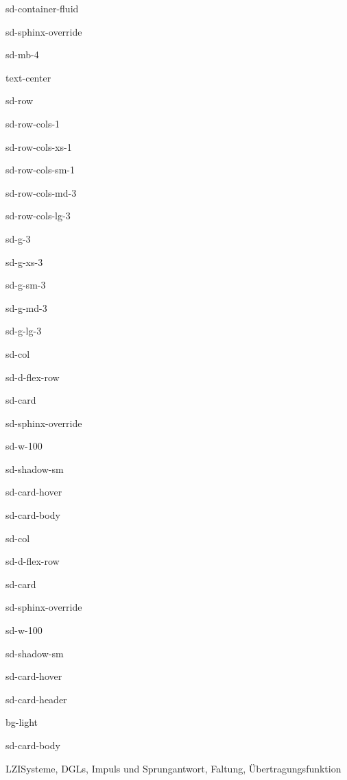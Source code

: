 \documentclass[letterpaper,10pt,english]{jupyterBook}
\let\sphinxpxdimen\pdfpxdimen\else\newdimen\sphinxpxdimen
\begin{document}
\begin{sphinxuseclass}{sd-container-fluid}
\begin{sphinxuseclass}{sd-sphinx-override}
\begin{sphinxuseclass}{sd-mb-4}
\begin{sphinxuseclass}{text-center}
\begin{sphinxuseclass}{sd-row}
\begin{sphinxuseclass}{sd-row-cols-1}
\begin{sphinxuseclass}{sd-row-cols-xs-1}
\begin{sphinxuseclass}{sd-row-cols-sm-1}
\begin{sphinxuseclass}{sd-row-cols-md-3}
\begin{sphinxuseclass}{sd-row-cols-lg-3}
\begin{sphinxuseclass}{sd-g-3}
\begin{sphinxuseclass}{sd-g-xs-3}
\begin{sphinxuseclass}{sd-g-sm-3}
\begin{sphinxuseclass}{sd-g-md-3}
\begin{sphinxuseclass}{sd-g-lg-3}
\begin{sphinxuseclass}{sd-col}
\begin{sphinxuseclass}{sd-d-flex-row}
\begin{sphinxuseclass}{sd-card}
\begin{sphinxuseclass}{sd-sphinx-override}
\begin{sphinxuseclass}{sd-w-100}
\begin{sphinxuseclass}{sd-shadow-sm}
\begin{sphinxuseclass}{sd-card-hover}
\begin{sphinxuseclass}{sd-card-body}
\end{sphinxuseclass}{\hyperref[\detokenize{content/3_FourierAnalyse::doc}]{}}
\end{sphinxuseclass}
\end{sphinxuseclass}
\end{sphinxuseclass}
\end{sphinxuseclass}
\end{sphinxuseclass}
\end{sphinxuseclass}
\end{sphinxuseclass}
\begin{sphinxuseclass}{sd-col}
\begin{sphinxuseclass}{sd-d-flex-row}
\begin{sphinxuseclass}{sd-card}
\begin{sphinxuseclass}{sd-sphinx-override}
\begin{sphinxuseclass}{sd-w-100}
\begin{sphinxuseclass}{sd-shadow-sm}
\begin{sphinxuseclass}{sd-card-hover}
\begin{sphinxuseclass}{sd-card-header}
\begin{sphinxuseclass}{bg-light}
\sphinxAtStartPar
{}

\end{sphinxuseclass}
\end{sphinxuseclass}
\begin{sphinxuseclass}{sd-card-body}
\noindent\sphinxincludegraphics[height=120\sphinxpxdimen]{{übertragungsfunktion}.png}

\sphinxAtStartPar
LZI\sphinxhyphen{}Systeme, DGLs, Impuls\sphinxhyphen{} und Sprungantwort, Faltung, Übertragungsfunktion


\end{sphinxuseclass}
\end{sphinxuseclass}
\end{sphinxuseclass}
\end{sphinxuseclass}
\end{sphinxuseclass}
\end{sphinxuseclass}
\end{sphinxuseclass}
\end{sphinxuseclass}
\end{sphinxuseclass}
\end{sphinxuseclass}
\end{sphinxuseclass}
\end{sphinxuseclass}
\end{sphinxuseclass}
\end{sphinxuseclass}
\end{sphinxuseclass}
\end{sphinxuseclass}
\end{sphinxuseclass}
\end{sphinxuseclass}
\end{sphinxuseclass}
\end{sphinxuseclass}
\end{sphinxuseclass}
\end{sphinxuseclass}
\end{sphinxuseclass}
\end{document}
